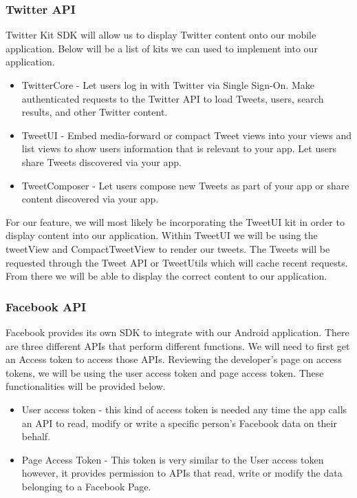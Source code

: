 \documentclass[onecolumn, draftclsnofoot,10pt, compsoc]{IEEEtran}
\begin{document}
\subsubsection{Twitter API}
Twitter Kit SDK will allow us to display Twitter content onto our mobile application. Below will be a list of kits we can used to implement into our application. 
\begin{itemize}

\item TwitterCore - Let users log in with Twitter via Single Sign-On. Make authenticated requests to the Twitter API to load Tweets, users, search results, and other Twitter content.\cite{TSDK}   
\item TweetUI - Embed media-forward or compact Tweet views into your views and list views to show users information that is relevant to your app. Let users share Tweets discovered via your app.\cite{TSDK}
\item TweetComposer - Let users compose new Tweets as part of your app or share content discovered via your app.\cite{TSDK} 

\end{itemize}

For our feature, we will most likely be incorporating the TweetUI kit in order to display content into our application. Within TweetUI we will be using the tweetView and CompactTweetView to render our tweets. The Tweets will be requested through the Tweet API or TweetUtils which will cache recent requests. From there we will be able to display the correct content to our application. \cite{Tweetshow} 

\subsubsection{Facebook API}
Facebook provides its own SDK to integrate with our Android application. There are three different APIs that perform different functions. We will need to first get an Access token to access those APIs. Reviewing the developer's page on access tokens, we will be using the user access token and page access token. These functionalities will be provided below.

\begin{itemize}

\item User access token - this kind of access token is needed any time the app calls an API to read, modify or write a specific person's Facebook data on their behalf. \cite{Faccess}
\item Page Access Token -  This token is very similar to the User access token however, it provides permission to APIs that read, write or modify the data belonging to a Facebook Page.\cite{Faccess}

\end{itemize}
\end{document}
